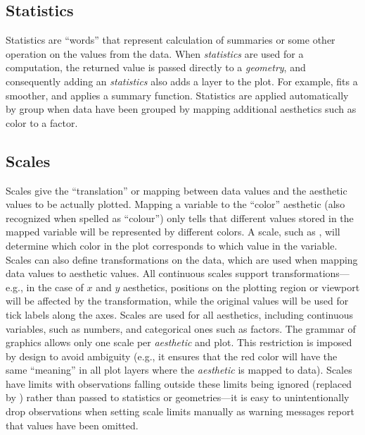 \documentclass[krantz2]{krantz}\usepackage{knitr}
\begin{document}
\subsection{Statistics}

Statistics are ``words'' that represent calculation of summaries or some other operation on the values from the data. When \emph{statistics} are used for a computation, the returned value is passed directly to a \emph{geometry}, and consequently adding an \emph{statistics} also adds a layer to the plot. For example,  fits a smoother, and  applies a summary function. Statistics are applied automatically by group when data have been grouped by mapping additional aesthetics such as color to a factor.

\subsection{Scales}

Scales give the ``translation'' or mapping between data values and the aesthetic values to be actually plotted. Mapping a variable to the ``color'' aesthetic (also recognized when spelled as ``colour'') only tells that different values stored in the mapped variable will be represented by different colors. A scale, such as , will determine which color in the plot corresponds to which value in the variable. Scales can also define transformations on the data, which are used when mapping data values to aesthetic values. All continuous scales support transformations---e.g., in the case of $x$ and $y$ aesthetics, positions on the plotting region or viewport will be affected by the transformation, while the original values will be used for tick labels along the axes.  Scales are used for all aesthetics, including continuous variables, such as numbers, and categorical ones such as factors. The grammar of graphics allows only one scale per \emph{aesthetic} and plot. This restriction is imposed by design to avoid ambiguity (e.g., it ensures that the red color will have the same ``meaning'' in all plot layers where the  \emph{aesthetic} is mapped to data). Scales have limits with observations falling outside these limits being ignored (replaced by ) rather than passed to statistics or geometries---it is easy to unintentionally drop observations when setting scale limits manually as warning messages report that  values have been omitted.
\end{document}
